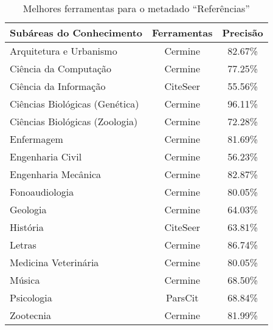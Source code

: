 \begin{table}
    \caption{Melhores ferramentas para o metadado ``Referências''}
    \begin{center}
        \begin{tabular}{|l|c|c|}
            \hline 
            \textbf{Subáreas do Conhecimento} & \textbf{Ferramentas} & \textbf{Precisão} \\ 
            \hline 
            Arquitetura e Urbanismo & Cermine & 82.67\% \\ \hline
            Ciência da Computação & Cermine & 77.25\% \\ \hline
            Ciência da Informação & CiteSeer & 55.56\% \\ \hline
            Ciências Biológicas (Genética) & Cermine & 96.11\% \\ \hline
            Ciências Biológicas (Zoologia) & Cermine & 72.28\% \\ \hline
            Enfermagem & Cermine & 81.69\% \\ \hline
            Engenharia Civil & Cermine & 56.23\% \\ \hline
            Engenharia Mecânica & Cermine & 82.87\% \\ \hline
            Fonoaudiologia & Cermine & 80.05\% \\ \hline
            Geologia & Cermine & 64.03\% \\ \hline
            História & CiteSeer & 63.81\% \\ \hline
            Letras & Cermine & 86.74\% \\ \hline
            Medicina Veterinária & Cermine & 80.05\% \\ \hline
            Música & Cermine & 68.50\% \\ \hline
            Psicologia & ParsCit & 68.84\% \\ \hline
            Zootecnia & Cermine & 81.99\% \\ \hline
        \end{tabular}
    \end{center}
    \label{tab:areas-references-tools}
\end{table}


